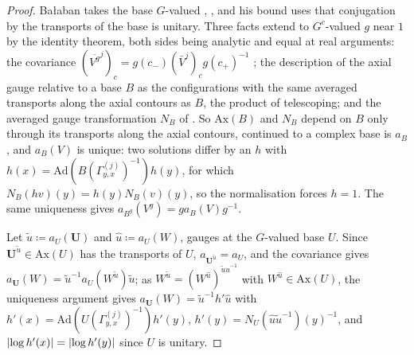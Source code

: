 \documentclass[11pt]{preprint}
\DeclarePairedDelimiter{\abs}{\lvert}{\rvert}
\numberwithin{equation}{section}
\theoremstyle{definition}
\theoremstyle{remark}
\theoremstyle{plain}
\begin{document}
\begin{proof}
Ba{\l}aban takes the base $G$-valued \cite[(1.33), p.~82]{BalabanREG}, \cite[p.~34, ll.~4--9]{BalabanAVG}, and his bound \cite[(1.70)]{BalabanREG} uses that conjugation by the transports of the base is unitary. Three facts extend to $G^c$-valued $g$ near $1$ by the identity theorem, both sides being analytic and equal at real arguments: the covariance $(\overline{V^g}^j)_c = g(c_-)(\bar V^j)_cg(c_+)^{-1}$ \cite[p.~78, l.~14]{BalabanREG}; the description of the axial gauge \cite[(1.19)--(1.20), p.~79]{BalabanREG} relative to a base $B$ as the configurations with the same averaged transports along the axial contours as $B$, the product of \cite[(1.19)]{BalabanREG} telescoping; and the averaged gauge transformation $N_B$ of \cite[(78)--(80), p.~30]{BalabanAVG}. So $\mathrm{Ax}(B)$ and $N_B$ depend on $B$ only through its transports along the axial contours, \cite[(106)]{BalabanAVG} continued to a complex base is $a_B$, and $a_B(V)$ is unique: two solutions differ by an $h$ with $h(x) = \mathrm{Ad}(B(\Gamma^{(j)}_{y,x})^{-1})h(y)$, for which $N_B(hv)(y) = h(y)N_B(v)(y)$, so the normalisation forces $h = 1$. The same uniqueness gives $a_{B^g}(V^g) = ga_B(V)g^{-1}$.

Let $\tilde u \coloneqq a_U(\mathbf U)$ and $\hat u \coloneqq a_U(W)$, gauges at the $G$-valued base $U$. Since $\mathbf U^{\tilde u} \in \mathrm{Ax}(U)$ has the transports of $U$, $a_{\mathbf U^{\tilde u}} = a_U$, and the covariance gives $a_{\mathbf U}(W) = \tilde u^{-1}a_U(W^{\tilde u})\tilde u$; as $W^{\tilde u} = (W^{\hat u})^{\tilde u\hat u^{-1}}$ with $W^{\hat u} \in \mathrm{Ax}(U)$, the uniqueness argument gives $a_{\mathbf U}(W) = \tilde u^{-1}h'\hat u$ with $h'(x) = \mathrm{Ad}(U(\Gamma^{(j)}_{y,x})^{-1})h'(y)$, $h'(y) = N_U(\hat u\tilde u^{-1})(y)^{-1}$, and $\abs{\log h'(x)} = \abs{\log h'(y)}$ since $U$ is unitary.


\end{proof}
\end{document}
